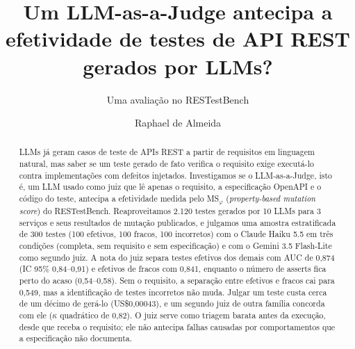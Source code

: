 \documentclass[sigconf,nonacm]{acmart}
\newcommand{\msphi}{MS$_\varphi$}
\begin{document}
\title{Um LLM-as-a-Judge antecipa a efetividade de testes de API REST gerados por LLMs?}
\subtitle{Uma avaliação no RESTestBench}

\author{Raphael de Almeida}

\begin{abstract}
LLMs já geram casos de teste de APIs REST a partir de requisitos em linguagem natural, mas saber se um teste
gerado de fato verifica o requisito exige executá-lo contra implementações com defeitos injetados.
Investigamos se o LLM-as-a-Judge, isto é, um LLM usado como juiz que lê apenas o requisito, a especificação
OpenAPI e o código do teste, antecipa a efetividade medida pelo \msphi{} (\emph{property-based mutation score}) do RESTestBench. Reaproveitamos
2.120 testes gerados por 10 LLMs para 3 serviços e seus resultados de mutação publicados, e julgamos uma
amostra estratificada de 300 testes (100 efetivos, 100 fracos, 100 incorretos) com o Claude Haiku 5.5 em
três condições (completa, sem requisito e sem especificação) e com o Gemini 3.5 Flash-Lite como segundo
juiz. A nota do juiz separa testes efetivos dos demais com AUC de 0,874 (IC 95\% 0,84--0,91) e efetivos
de fracos com 0,841, enquanto o número de asserts fica perto do acaso (0,54--0,58). Sem o requisito, a
separação entre efetivos e fracos cai para 0,549, mas a identificação de testes incorretos não muda. Julgar
um teste custa cerca de um décimo de gerá-lo (US\$0,00043), e um segundo juiz de outra família concorda
com ele ($\kappa$ quadrático de 0,82). O juiz serve
como triagem barata antes da execução, desde que receba o requisito; ele não antecipa falhas causadas por
comportamentos que a especificação não documenta.
\end{abstract}

\renewcommand\keywordsname{Palavras-chave}

\maketitle
\end{document}
